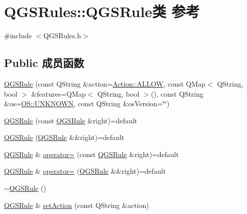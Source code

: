 \hypertarget{class_q_g_s_rules_1_1_q_g_s_rule}{}\section{Q\+G\+S\+Rules\+:\+:Q\+G\+S\+Rule类 参考}
\label{class_q_g_s_rules_1_1_q_g_s_rule}


{\ttfamily \#include $<$Q\+G\+S\+Rules.\+h$>$}

\subsection*{Public 成员函数}
\begin{DoxyCompactItemize}
\item 
\mbox{\hyperlink{class_q_g_s_rules_1_1_q_g_s_rule_a4388fb023e874f4401997c5c2f46ee2e}{Q\+G\+S\+Rule}} (const Q\+String \&action=\mbox{\hyperlink{namespace_action_a019c221c4527d6eeea3ce813d6b495f4}{Action\+::\+A\+L\+L\+OW}}, const Q\+Map$<$ Q\+String, bool $>$ \&features=Q\+Map$<$ Q\+String, bool $>$(), const Q\+String \&os=\mbox{\hyperlink{namespace_o_s_a03d369686c450602db02bac63d973c99}{O\+S\+::\+U\+N\+K\+N\+O\+WN}}, const Q\+String \&os\+Version=\char`\"{}\char`\"{})
\item 
\mbox{\hyperlink{class_q_g_s_rules_1_1_q_g_s_rule_a4aa6410771bf449727119a9337c389ae}{Q\+G\+S\+Rule}} (const \mbox{\hyperlink{class_q_g_s_rules_1_1_q_g_s_rule}{Q\+G\+S\+Rule}} \&right)=default
\item 
\mbox{\hyperlink{class_q_g_s_rules_1_1_q_g_s_rule_a3f785b08b63dedf3354ef33b393e3a71}{Q\+G\+S\+Rule}} (\mbox{\hyperlink{class_q_g_s_rules_1_1_q_g_s_rule}{Q\+G\+S\+Rule}} \&\&right)=default
\item 
\mbox{\hyperlink{class_q_g_s_rules_1_1_q_g_s_rule}{Q\+G\+S\+Rule}} \& \mbox{\hyperlink{class_q_g_s_rules_1_1_q_g_s_rule_aeaa8fecf6317667b4cd8de00f4aa9f0b}{operator=}} (const \mbox{\hyperlink{class_q_g_s_rules_1_1_q_g_s_rule}{Q\+G\+S\+Rule}} \&right)=default
\item 
\mbox{\hyperlink{class_q_g_s_rules_1_1_q_g_s_rule}{Q\+G\+S\+Rule}} \& \mbox{\hyperlink{class_q_g_s_rules_1_1_q_g_s_rule_a8b21435bf4144abe169f068d423f561c}{operator=}} (\mbox{\hyperlink{class_q_g_s_rules_1_1_q_g_s_rule}{Q\+G\+S\+Rule}} \&\&right)=default
\item 
\mbox{\hyperlink{class_q_g_s_rules_1_1_q_g_s_rule_a7df7ab9bc3fd2d7c6633877dc044459b}{$\sim$\+Q\+G\+S\+Rule}} ()
\item 
\mbox{\hyperlink{class_q_g_s_rules_1_1_q_g_s_rule}{Q\+G\+S\+Rule}} \& \mbox{\hyperlink{class_q_g_s_rules_1_1_q_g_s_rule_aebf5bd64ff20a8bb29e770799f21b78d}{set\+Action}} (const Q\+String \&action)

\end{DoxyCompactItemize}
